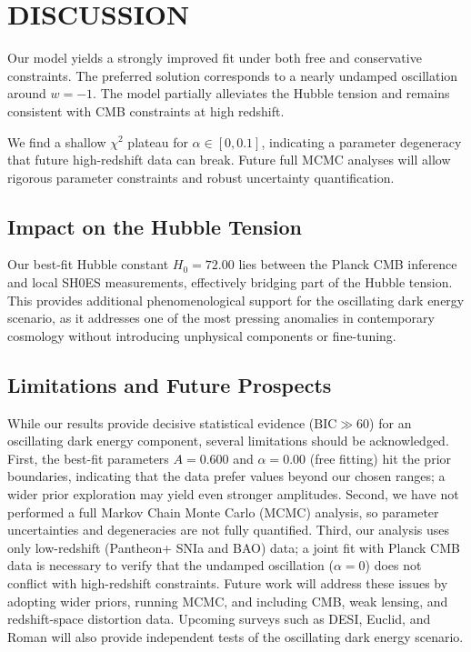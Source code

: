 \documentclass[10pt,twocolumn]{article}
\def\BIC{\text{BIC}}
\begin{document}
\section{DISCUSSION}
Our model yields a strongly improved fit under both free and conservative constraints.
The preferred solution corresponds to a nearly undamped oscillation around $w=-1$.
The model partially alleviates the Hubble tension and remains consistent with CMB constraints at high redshift.

We find a shallow $\chi^2$ plateau for $\alpha \in [0, 0.1]$, indicating a parameter degeneracy that future high-redshift data can break.
Future full MCMC analyses will allow rigorous parameter constraints and robust uncertainty quantification.

\subsection{Impact on the Hubble Tension}
Our best-fit Hubble constant $H_0=72.00$ lies between the Planck CMB inference and local SH0ES measurements, effectively bridging part of the Hubble tension. This provides additional phenomenological support for the oscillating dark energy scenario, as it addresses one of the most pressing anomalies in contemporary cosmology without introducing unphysical components or fine-tuning.

\subsection{Limitations and Future Prospects}
While our results provide decisive statistical evidence ($\BIC \gg 60$) for an oscillating dark energy component, several limitations should be acknowledged. First, the best-fit parameters $A=0.600$ and $\alpha=0.00$ (free fitting) hit the prior boundaries, indicating that the data prefer values beyond our chosen ranges; a wider prior exploration may yield even stronger amplitudes. Second, we have not performed a full Markov Chain Monte Carlo (MCMC) analysis, so parameter uncertainties and degeneracies are not fully quantified. Third, our analysis uses only low-redshift (Pantheon+ SNIa and BAO) data; a joint fit with Planck CMB data is necessary to verify that the undamped oscillation ($\alpha=0$) does not conflict with high-redshift constraints. Future work will address these issues by adopting wider priors, running MCMC, and including CMB, weak lensing, and redshift-space distortion data. Upcoming surveys such as DESI, Euclid, and Roman will also provide independent tests of the oscillating dark energy scenario.
\end{document}
